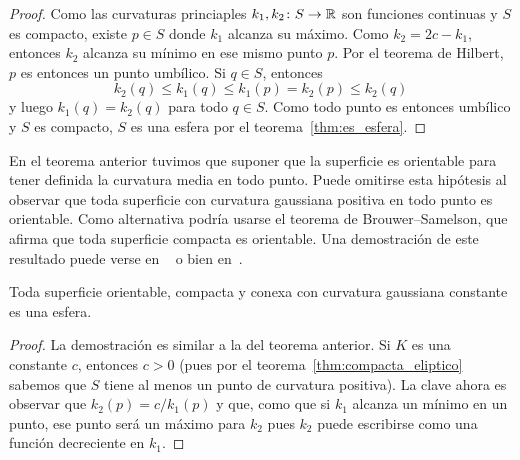 \begin{proof}
%
	Como las curvaturas princiaples $k_1,k_2\colon S\to\mathbb{R}$ son funciones
	continuas y $S$ es compacto, existe $p\in S$ donde $k_1$ alcanza su máximo.
	Como $k_2=2c-k_1$, entonces $k_2$ alcanza su mínimo en ese mismo punto $p$.
	Por el teorema de Hilbert, $p$ es entonces un punto umbílico.  Si $q\in S$,
	entonces
	\[
		k_2(q)\leq k_1(q)\leq k_1(p)=k_2(p)\leq k_2(q)
	\]
	y luego $k_1(q)=k_2(q)$ para todo $q\in S$. Como todo punto es entonces
	umbílico y $S$ es compacto, $S$ es una esfera por el
	teorema~\ref{thm:es_esfera}.
\end{proof}

En el teorema anterior tuvimos que suponer que la superficie es orientable para
tener definida la curvatura media en todo punto. Puede omitirse esta hipótesis
al observar que toda superficie con curvatura gaussiana positiva en todo punto
es orientable. Como alternativa podría usarse el teorema de Brouwer--Samelson,
que afirma que toda superficie compacta es orientable. Una demostración de este
resultado puede verse en ~\cite[Theorem 4.16]{MR2522595} o bien
en~\cite[Theorem 4.7.15]{MR2964051}.

\begin{theorem}
	Toda superficie orientable, compacta y conexa con curvatura gaussiana
	constante es una esfera.
\end{theorem}

\begin{proof}
	La demostración es similar a la del teorema anterior. 
	Si $K$ es una constante $c$, entonces $c>0$ (pues por el 
	teorema~\ref{thm:compacta_eliptico} sabemos que $S$ 
	tiene al menos un punto de curvatura positiva).  
	La clave ahora es observar que $k_2(p)=c/k_1(p)$ y que, como 
	que si $k_1$ alcanza un mínimo en un punto, ese punto será un máximo para
	$k_2$ pues $k_2$ puede escribirse como una función decreciente en $k_1$.
\end{proof}

